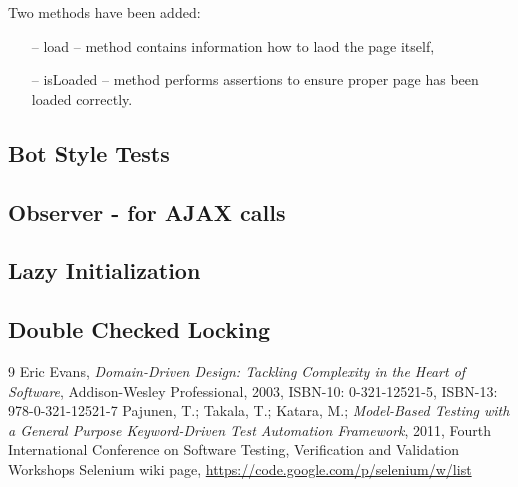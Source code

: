 \documentclass[12pt,twoside]{article}
\begin{document}
Two methods have been added:
\begin{itemize}
\item [--] load -- method contains information how to laod the page itself,
\item [--] isLoaded -- method performs assertions to ensure proper page has been loaded correctly.
\end{itemize}
\subsection{Bot Style Tests}
\subsection{Observer - for AJAX calls}
\subsection{Lazy Initialization}
\subsection{Double Checked Locking}




\begin{thebibliography} {9}
 Eric Evans, {\sl Domain-Driven Design: Tackling Complexity in the Heart of Software}, Addison-Wesley Professional, 2003, ISBN-10: 0-321-12521-5, ISBN-13: 978-0-321-12521-7
 Pajunen, T.; Takala, T.; Katara, M.; {\sl Model-Based Testing with a General Purpose Keyword-Driven Test Automation Framework}, 2011, Fourth International Conference on Software Testing, Verification and Validation Workshops
 Selenium wiki page, \url{https://code.google.com/p/selenium/w/list}
\end{thebibliography}
\end{document}
